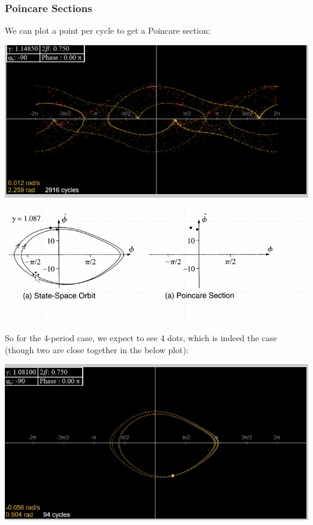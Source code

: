 \subsubsection{Poincare Sections}
We can plot a point per cycle to get a Poincare section:
\begin{center}
    \includegraphics[scale=0.7]{Lecture-33/l33-img16.png}
    \includegraphics[scale=0.7]{Lecture-33/l33-img17.png}
\end{center}
So for the 4-period case, we expect to see 4 dots, which is indeed the case (though two are close together in the below plot):
\begin{center}
    \includegraphics[scale=0.7]{Lecture-33/l33-img18.png}
\end{center}
